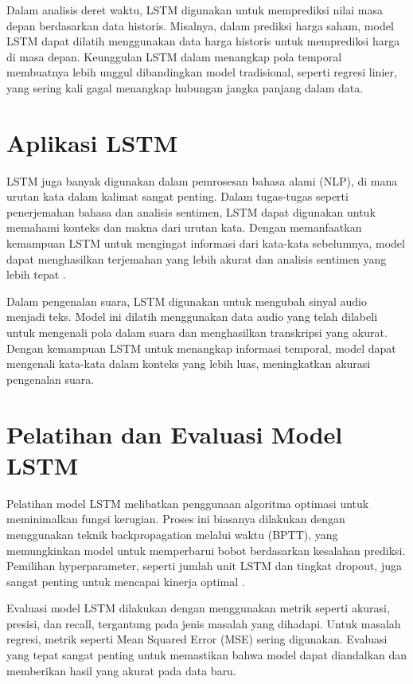 \par Dalam analisis deret waktu, LSTM digunakan untuk memprediksi nilai masa depan berdasarkan data historis. Misalnya, dalam prediksi harga saham, model LSTM dapat dilatih menggunakan data harga historis untuk memprediksi harga di masa depan. Keunggulan LSTM dalam menangkap pola temporal membuatnya lebih unggul dibandingkan model tradisional, seperti regresi linier, yang sering kali gagal menangkap hubungan jangka panjang dalam data.

\section{Aplikasi LSTM}
\par LSTM juga banyak digunakan dalam pemrosesan bahasa alami (NLP), di mana urutan kata dalam kalimat sangat penting. Dalam tugas-tugas seperti penerjemahan bahasa dan analisis sentimen, LSTM dapat digunakan untuk memahami konteks dan makna dari urutan kata. Dengan memanfaatkan kemampuan LSTM untuk mengingat informasi dari kata-kata sebelumnya, model dapat menghasilkan terjemahan yang lebih akurat dan analisis sentimen yang lebih tepat \parencite{zhang2019}.

\par Dalam pengenalan suara, LSTM digunakan untuk mengubah sinyal audio menjadi teks. Model ini dilatih menggunakan data audio yang telah dilabeli untuk mengenali pola dalam suara dan menghasilkan transkripsi yang akurat. Dengan kemampuan LSTM untuk menangkap informasi temporal, model dapat mengenali kata-kata dalam konteks yang lebih luas, meningkatkan akurasi pengenalan suara.

\section{Pelatihan dan Evaluasi Model LSTM}
\par Pelatihan model LSTM melibatkan penggunaan algoritma optimasi untuk meminimalkan fungsi kerugian. Proses ini biasanya dilakukan dengan menggunakan teknik backpropagation melalui waktu (BPTT), yang memungkinkan model untuk memperbarui bobot berdasarkan kesalahan prediksi. Pemilihan hyperparameter, seperti jumlah unit LSTM dan tingkat dropout, juga sangat penting untuk mencapai kinerja optimal \parencite{bengio2012}.

\par Evaluasi model LSTM dilakukan dengan menggunakan metrik seperti akurasi, presisi, dan recall, tergantung pada jenis masalah yang dihadapi. Untuk masalah regresi, metrik seperti Mean Squared Error (MSE) sering digunakan. Evaluasi yang tepat sangat penting untuk memastikan bahwa model dapat diandalkan dan memberikan hasil yang akurat pada data baru.



